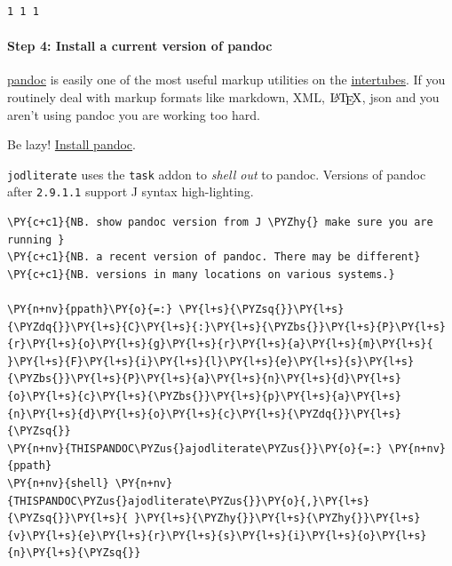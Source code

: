     \begin{Verbatim}[commandchars=\\\{\}]
1 1 1
    \end{Verbatim}

    \hypertarget{step-4-install-a-current-version-of-pandoc}{%
\paragraph{Step 4: Install a current version of
pandoc}\label{step-4-install-a-current-version-of-pandoc}}

\href{https://pandoc.org/}{pandoc} is easily one of the most useful
markup utilities on the
\href{https://www.urbandictionary.com/define.php?term=intertubes}{intertubes}.
If you routinely deal with markup formats like markdown, XML,
\(\LaTeX\), json and you aren't using pandoc you are working too hard.

Be lazy! \href{https://pandoc.org/installing.html}{Install pandoc}.

\texttt{jodliterate} uses the \texttt{task} addon to \emph{shell out} to
pandoc. Versions of pandoc after \texttt{2.9.1.1} support J syntax
high-lighting.

    \begin{tcolorbox}[breakable, size=fbox, boxrule=1pt, pad at break*=1mm,colback=cellbackground, colframe=cellborder]
\begin{Verbatim}[commandchars=\\\{\}]
\PY{c+c1}{NB. show pandoc version from J \PYZhy{} make sure you are running }
\PY{c+c1}{NB. a recent version of pandoc. There may be different}
\PY{c+c1}{NB. versions in many locations on various systems.}

\PY{n+nv}{ppath}\PY{o}{=:} \PY{l+s}{\PYZsq{}}\PY{l+s}{\PYZdq{}}\PY{l+s}{C}\PY{l+s}{:}\PY{l+s}{\PYZbs{}}\PY{l+s}{P}\PY{l+s}{r}\PY{l+s}{o}\PY{l+s}{g}\PY{l+s}{r}\PY{l+s}{a}\PY{l+s}{m}\PY{l+s}{ }\PY{l+s}{F}\PY{l+s}{i}\PY{l+s}{l}\PY{l+s}{e}\PY{l+s}{s}\PY{l+s}{\PYZbs{}}\PY{l+s}{P}\PY{l+s}{a}\PY{l+s}{n}\PY{l+s}{d}\PY{l+s}{o}\PY{l+s}{c}\PY{l+s}{\PYZbs{}}\PY{l+s}{p}\PY{l+s}{a}\PY{l+s}{n}\PY{l+s}{d}\PY{l+s}{o}\PY{l+s}{c}\PY{l+s}{\PYZdq{}}\PY{l+s}{\PYZsq{}}
\PY{n+nv}{THISPANDOC\PYZus{}ajodliterate\PYZus{}}\PY{o}{=:} \PY{n+nv}{ppath}
\PY{n+nv}{shell} \PY{n+nv}{THISPANDOC\PYZus{}ajodliterate\PYZus{}}\PY{o}{,}\PY{l+s}{\PYZsq{}}\PY{l+s}{ }\PY{l+s}{\PYZhy{}}\PY{l+s}{\PYZhy{}}\PY{l+s}{v}\PY{l+s}{e}\PY{l+s}{r}\PY{l+s}{s}\PY{l+s}{i}\PY{l+s}{o}\PY{l+s}{n}\PY{l+s}{\PYZsq{}}
\end{Verbatim}
\end{tcolorbox}

